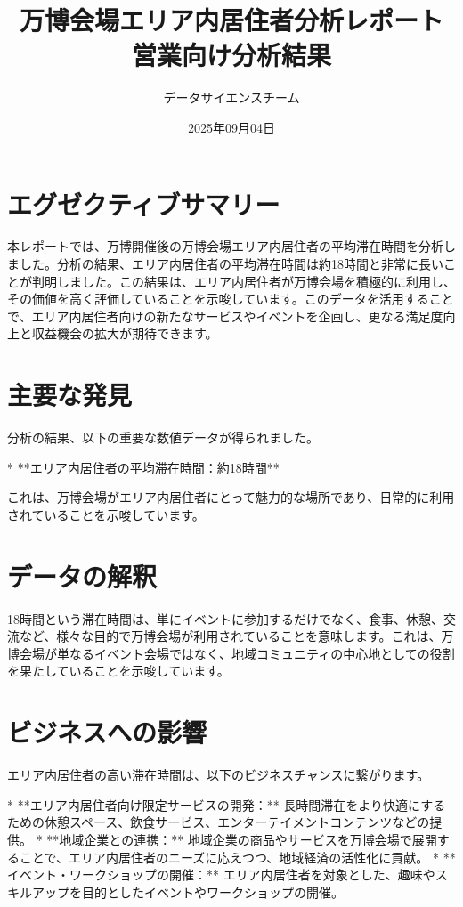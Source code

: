 \documentclass[11pt,a4paper]{article}
\title{\textbf{万博会場エリア内居住者分析レポート} \\ 営業向け分析結果}
\author{データサイエンスチーム}
\date{2025年09月04日}
\begin{document}
\maketitle

\newpage

\section*{エグゼクティブサマリー}

本レポートでは、万博開催後の万博会場エリア内居住者の平均滞在時間を分析しました。分析の結果、エリア内居住者の平均滞在時間は約18時間と非常に長いことが判明しました。この結果は、エリア内居住者が万博会場を積極的に利用し、その価値を高く評価していることを示唆しています。このデータを活用することで、エリア内居住者向けの新たなサービスやイベントを企画し、更なる満足度向上と収益機会の拡大が期待できます。

\section*{主要な発見}

分析の結果、以下の重要な数値データが得られました。

*   **エリア内居住者の平均滞在時間：約18時間**

これは、万博会場がエリア内居住者にとって魅力的な場所であり、日常的に利用されていることを示唆しています。

\section*{データの解釈}

18時間という滞在時間は、単にイベントに参加するだけでなく、食事、休憩、交流など、様々な目的で万博会場が利用されていることを意味します。これは、万博会場が単なるイベント会場ではなく、地域コミュニティの中心地としての役割を果たしていることを示唆しています。

\section*{ビジネスへの影響}

エリア内居住者の高い滞在時間は、以下のビジネスチャンスに繋がります。

*   **エリア内居住者向け限定サービスの開発：** 長時間滞在をより快適にするための休憩スペース、飲食サービス、エンターテイメントコンテンツなどの提供。
*   **地域企業との連携：** 地域企業の商品やサービスを万博会場で展開することで、エリア内居住者のニーズに応えつつ、地域経済の活性化に貢献。
*   **イベント・ワークショップの開催：** エリア内居住者を対象とした、趣味やスキルアップを目的としたイベントやワークショップの開催。
\end{document}
